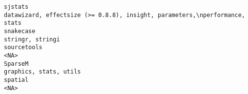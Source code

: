 \documentclass[
  letterpaper,
  DIV=11,
  numbers=noendperiod]{scrreprt}
\begin{document}
\begin{verbatim}
sjstats                                                                                                                                                                                                                                                                                                                                                                                                                                                                                                                                        datawizard, effectsize (>= 0.8.8), insight, parameters,\nperformance, stats
snakecase                                                                                                                                                                                                                                                                                                                                                                                                                                                                                                                                                                                                 stringr, stringi
sourcetools                                                                                                                                                                                                                                                                                                                                                                                                                                                                                                                                                                                                           <NA>
SparseM                                                                                                                                                                                                                                                                                                                                                                                                                                                                                                                                                                                             graphics, stats, utils
spatial                                                                                                                                                                                                                                                                                                                                                                                                                                                                                                                                                                                                               <NA>

\end{verbatim}
\end{document}
